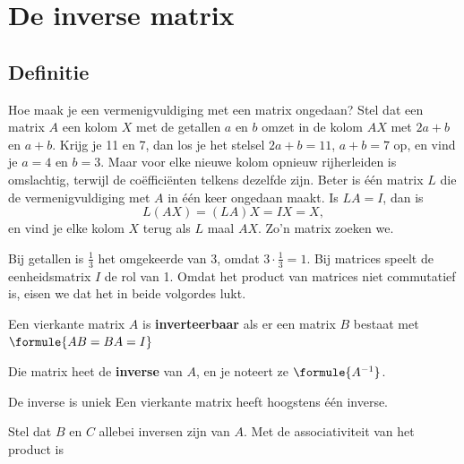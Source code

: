 \begin{oefeningen}[Start]

\end{oefeningen}


\section{De inverse matrix}

\subsection{Definitie}

Hoe maak je een vermenigvuldiging met een matrix ongedaan? Stel dat een matrix $A$ een kolom $X$ met de getallen $a$ en $b$ omzet in de kolom $AX$ met $2a + b$ en $a + b$. Krijg je 11 en 7, dan los je het stelsel $2a + b = 11$, $a + b = 7$ op, en vind je $a = 4$ en $b = 3$. Maar voor elke nieuwe kolom opnieuw rijherleiden is omslachtig, terwijl de coëfficiënten telkens dezelfde zijn. Beter is één matrix $L$ die de vermenigvuldiging met $A$ in één keer ongedaan maakt. Is $LA = I$, dan is
\[ L(AX) = (LA)X = IX = X , \]
en vind je elke kolom $X$ terug als $L$ maal $AX$. Zo'n matrix zoeken we.

Bij getallen is $\frac13$ het omgekeerde van 3, omdat $3 \cdot \frac13 = 1$. Bij matrices speelt de eenheidsmatrix $I$ de rol van 1. Omdat het product van matrices niet commutatief is, eisen we dat het in beide volgordes lukt.

\begin{theorie}
Een vierkante matrix $A$ is \textbf{\textcolor{accent}{inverteerbaar}} als er een matrix $B$ bestaat met \quad $\formule{AB = BA = I}$

\vspace{1mm}
Die matrix heet de \textbf{\textcolor{accent}{inverse}} van $A$, en je noteert ze $\formule{A^{-1}}$.

\begin{stelling}{De inverse is uniek}
Een vierkante matrix heeft hoogstens één inverse.
\end{stelling}

\begin{bewijs}
Stel dat $B$ en $C$ allebei inversen zijn van $A$. Met de associativiteit van het product is
\end{bewijs}
\end{theorie}

